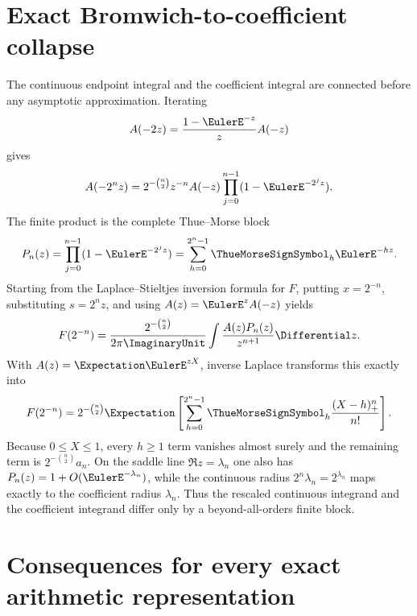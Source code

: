 \documentclass[11pt,oneside]{article}
\theoremstyle{definition}
\theoremstyle{remark}
\begin{document}
\section{Exact Bromwich-to-coefficient collapse}
\label{dyadicasym:sec:bromwich-collapse}

The continuous endpoint integral and the coefficient integral are connected before any
asymptotic approximation.  Iterating
\begin{equation}
 A(-2z)=\frac{1-\EulerE^{-z}}zA(-z)
 \label{dyadicasym:eq:negative-refinement}
\end{equation}
gives
\begin{equation}
 A(-2^nz)=2^{-\binom n2}z^{-n}A(-z)
 \prod_{j=0}^{n-1}(1-\EulerE^{-2^jz}).
 \label{dyadicasym:eq:negative-refinement-iterated}
\end{equation}
The finite product is the complete Thue--Morse block
\begin{equation}
 P_n(z)=\prod_{j=0}^{n-1}(1-\EulerE^{-2^jz})
 =\sum_{h=0}^{2^n-1}\ThueMorseSignSymbol_h\EulerE^{-hz}.
 \label{dyadicasym:eq:Bromwich-TM-product}
\end{equation}
Starting from the Laplace--Stieltjes inversion formula for $F$, putting
$x=2^{-n}$, substituting $s=2^nz$, and using $A(z)=\EulerE^zA(-z)$ yields
\begin{equation}
 F(2^{-n})=\frac{2^{-\binom n2}}{2\pi\ImaginaryUnit}
 \int\frac{A(z)P_n(z)}{z^{n+1}}\Differential z.
 \label{dyadicasym:eq:Bromwich-rescaled}
\end{equation}
With $A(z)=\Expectation\EulerE^{zX}$, inverse Laplace transforms this exactly into
\begin{equation}
 F(2^{-n})=2^{-\binom n2}\Expectation\left[
 \sum_{h=0}^{2^n-1}\ThueMorseSignSymbol_h\frac{(X-h)_+^n}{n!}\right].
 \label{dyadicasym:eq:positive-part-collapse}
\end{equation}
Because $0\le X\le1$, every $h\ge1$ term vanishes almost surely and the remaining term is
$2^{-\binom n2}a_n$.  On the saddle line $\Re z=\lambda_n$ one also has
$P_n(z)=1+O(\EulerE^{-\lambda_n})$, while the continuous radius
$2^n\lambda_n=2^{\lambda_n}$ maps exactly to the coefficient radius $\lambda_n$.
Thus the rescaled continuous integrand and the coefficient integrand differ only by a
beyond-all-orders finite block.

\section{Consequences for every exact arithmetic representation}
\label{dyadicasym:sec:corollaries}
\end{document}
